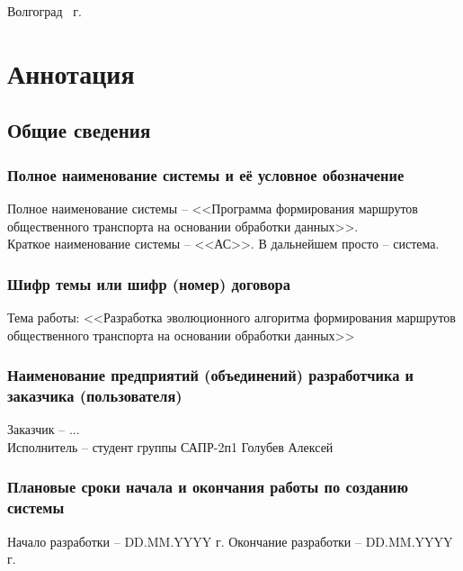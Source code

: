 \vspace{\fill}
\begin{center}
    Волгоград \the\year\ г.
\end{center}
\newpage

\stopcontents

\tocless\part{Аннотация}
\newpage

\startcontents[sections]
\setcounter{chapter}{0}


\chapter{Общие сведения}
\section{Полное наименование системы и её условное обозначение}
Полное наименование системы -- <<Программа формирования маршрутов 
общественного транспорта на основании обработки данных>>.\\
Краткое наименование системы -- <<АС>>. В дальнейшем просто -- система.

\section{Шифр темы или шифр (номер) договора}
Тема работы: <<Разработка эволюционного алгоритма формирования маршрутов 
общественного транспорта на основании обработки данных>>\\

\section{Наименование предприятий (объединений) разработчика и заказчика (пользователя)}
Заказчик -- ...\\
Исполнитель -- студент группы САПР-2п1 Голубев Алексей

\section{Плановые сроки начала и окончания работы по созданию системы}
Начало разработки -- DD.MM.YYYY г. Окончание разработки -- DD.MM.YYYY г.

